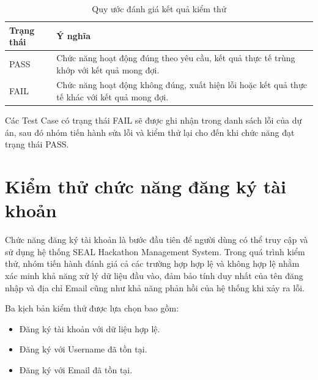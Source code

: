 \begin{table}[H]
	\centering
	\caption{Quy ước đánh giá kết quả kiểm thử}
	\label{tab:test-status}
	
	\renewcommand{\arraystretch}{1.3}
	
	\begin{tabular}{|p{3cm}|p{10cm}|}
		
		\hline
		
		\textbf{Trạng thái} &
		\textbf{Ý nghĩa}
		
		\\
		
		\hline
		
		PASS &
		Chức năng hoạt động đúng theo yêu cầu, kết quả thực tế trùng khớp với kết quả mong đợi.
		
		\\
		
		\hline
		
		FAIL &
		Chức năng hoạt động không đúng, xuất hiện lỗi hoặc kết quả thực tế khác với kết quả mong đợi.
		
		\\
		
		\hline
		
	\end{tabular}
	
\end{table}

Các Test Case có trạng thái FAIL sẽ được ghi nhận trong danh sách lỗi của dự án, sau đó nhóm tiến hành sửa lỗi và kiểm thử lại cho đến khi chức năng đạt trạng thái PASS.
\section{Kiểm thử chức năng đăng ký tài khoản}

Chức năng đăng ký tài khoản là bước đầu tiên để người dùng có thể truy cập và sử dụng hệ thống SEAL Hackathon Management System. Trong quá trình kiểm thử, nhóm tiến hành đánh giá cả các trường hợp hợp lệ và không hợp lệ nhằm xác minh khả năng xử lý dữ liệu đầu vào, đảm bảo tính duy nhất của tên đăng nhập và địa chỉ Email cũng như khả năng phản hồi của hệ thống khi xảy ra lỗi.

Ba kịch bản kiểm thử được lựa chọn bao gồm:

\begin{itemize}
	\item Đăng ký tài khoản với dữ liệu hợp lệ.
	\item Đăng ký với Username đã tồn tại.
	\item Đăng ký với Email đã tồn tại.
\end{itemize}

